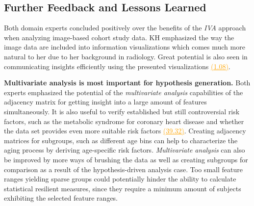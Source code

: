 \documentclass[journal]{style/vgtc} 			          %
\newcommand{\com}[1]{\textcolor{orange}{\uline{#1}}}
\begin{document}

\subsection{Further Feedback and Lessons Learned} \label{Lessons Learned}
%
Both domain experts concluded positively over the benefits of the \emph{IVA} approach when analyzing image-based cohort study data.
%
KH emphasized the way the image data are included into information visualizations which comes much more natural to her due to her background in radiology.
%
%
Great potential is also seen in communicating insights efficiently using the presented visualizations \com{(1.08)}.

\textbf{Multivariate analysis is most important for hypothesis generation.}
Both experts emphasized the potential of the \emph{multivariate analysis} capabilities of the adjacency matrix for getting insight into a large amount of features simultaneously.
%
It is also useful to verify established but still controversial risk factors, such as the metabolic syndrome for coronary heart disease and whether the data set provides even more suitable risk factors \com{(39.32)}.
%
Creating adjacency matrices for subgroups, such as different age bins can help to characterize the aging process by deriving age-specific risk factors.
%
\emph{Multivariate analysis} can also be improved by more ways of brushing the data as well as creating subgroups for comparison as a result of the hypothesis-driven analysis case.
%
Too small feature ranges yielding sparse groups could potentially hinder the ability to calculate statistical resilient measures, since they require a minimum amount of subjects exhibiting the selected feature ranges.
%
\end{document}
